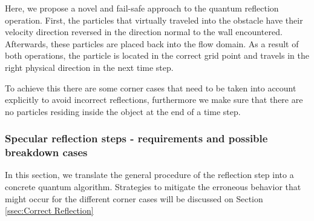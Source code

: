 \normalem
Here, we propose a novel and fail-safe approach to the quantum reflection operation. 
First, the particles that virtually traveled into the obstacle have their velocity direction reversed in the direction normal to the wall encountered. 
Afterwards, these particles are placed back into the flow domain. As a result of both operations, the particle is located in the correct grid point and travels in the right physical direction in the next time step.

To achieve this there are some corner cases that need to be taken into account explicitly to avoid incorrect reflections, furthermore we make sure that there are no particles residing inside the object at the end of a time step. 



\subsubsection{Specular reflection steps - requirements and possible breakdown cases}
In this section, we translate the general procedure of the reflection step into a concrete quantum algorithm. Strategies to mitigate the erroneous behavior that might occur for the different corner cases will be discussed on Section \ref{ssec:Correct Reflection}

